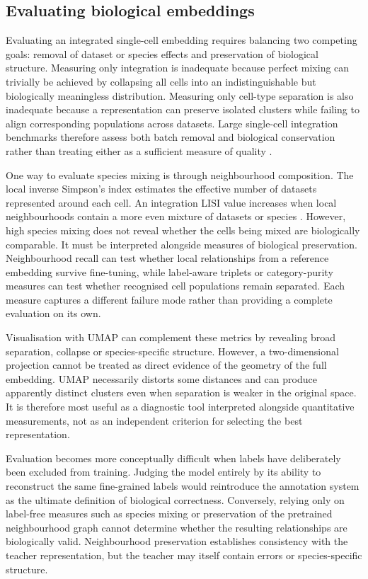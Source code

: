 \documentclass{article}
\begin{document}
\subsection{Evaluating biological embeddings}
\label{sec:evaluating}
Evaluating an integrated single-cell embedding requires balancing two competing goals: removal of dataset or species effects and preservation of biological structure. Measuring only integration is inadequate because perfect mixing can trivially be achieved by collapsing all cells into an indistinguishable but biologically meaningless distribution. Measuring only cell-type separation is also inadequate because a representation can preserve isolated clusters while failing to align corresponding populations across datasets. Large single-cell integration benchmarks therefore assess both batch removal and biological conservation rather than treating either as a sufficient measure of quality \cite{BenchmarkingIntegration}.

One way to evaluate species mixing is through neighbourhood composition. The local inverse Simpson’s index estimates the effective number of datasets represented around each cell. An integration LISI value increases when local neighbourhoods contain a more even mixture of datasets or species \cite{Harmony}. However, high species mixing does not reveal whether the cells being mixed are biologically comparable. It must be interpreted alongside measures of biological preservation. Neighbourhood recall can test whether local relationships from a reference embedding survive fine-tuning, while label-aware triplets or category-purity measures can test whether recognised cell populations remain separated. Each measure captures a different failure mode rather than providing a complete evaluation on its own.

Visualisation with UMAP can complement these metrics by revealing broad separation, collapse or species-specific structure. However, a two-dimensional projection cannot be treated as direct evidence of the geometry of the full embedding. UMAP necessarily distorts some distances and can produce apparently distinct clusters even when separation is weaker in the original space. It is therefore most useful as a diagnostic tool interpreted alongside quantitative measurements, not as an independent criterion for selecting the best representation.

Evaluation becomes more conceptually difficult when labels have deliberately been excluded from training. Judging the model entirely by its ability to reconstruct the same fine-grained labels would reintroduce the annotation system as the ultimate definition of biological correctness. Conversely, relying only on label-free measures such as species mixing or preservation of the pretrained neighbourhood graph cannot determine whether the resulting relationships are biologically valid. Neighbourhood preservation establishes consistency with the teacher representation, but the teacher may itself contain errors or species-specific structure.
\end{document}
